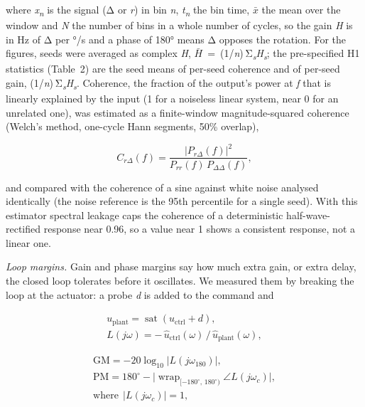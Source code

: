 \documentclass[11pt,letterpaper]{article}
\begin{document}
\noindent where \emph{x\textsubscript{n}} is the signal (Δ or \emph{r})
in bin \emph{n}, \emph{t\textsubscript{n}} the bin time, \emph{\ensuremath{\bar{x}}} the
mean over the window and \emph{N} the number of bins in a whole number
of cycles, so the gain \textbar{}\emph{H}\textbar{} is in Hz of Δ per
°/s and a phase of 180° means Δ opposes the rotation. For the figures,
seeds were averaged as complex \emph{H},
\emph{\ensuremath{\bar{H}}}~=~(1/\emph{n}) Σ\textsubscript{\emph{s}}\emph{H\textsubscript{s}};
the pre-specified H1 statistics (Table~2) are the seed means of per-seed
coherence and of per-seed gain,
(1/\emph{n}) Σ\textsubscript{\emph{s}}\textbar{}\emph{H\textsubscript{s}}\textbar.
Coherence, the fraction of the output's power at \emph{f} that is
linearly explained by the input (1 for a noiseless linear system, near 0
for an unrelated one), was estimated as a finite-window
magnitude-squared coherence (Welch's method, one-cycle Hann segments,
50\% overlap),

\[C_{r\Delta}(f)=\frac{|P_{r\Delta}(f)|^2}{P_{rr}(f)\,P_{\Delta\Delta}(f)},\tag{10}\]

\noindent and compared with the coherence of a sine against white noise
analysed identically (the noise reference is the 95th percentile for a
single seed). With this estimator spectral leakage caps the coherence of
a deterministic half-wave-rectified response near 0.96, so a value near
1 shows a consistent response, not a linear one.

\emph{Loop margins.} Gain and phase margins say how much extra gain, or
extra delay, the closed loop tolerates before it oscillates. We measured
them by breaking the loop at the actuator: a probe \emph{d} is added to
the command and

\[\begin{gathered}u_{\mathrm{plant}}=\operatorname{sat}(u_{\mathrm{ctrl}}+d),\\ L(j\omega)=-\,\hat u_{\mathrm{ctrl}}(\omega)\,/\,\hat u_{\mathrm{plant}}(\omega),\end{gathered}\tag{11}\]

\[\begin{gathered}\mathrm{GM}=-20\log_{10}\bigl|L(j\omega_{180})\bigr|,\\ \mathrm{PM}=180^\circ-\bigl|\operatorname{wrap}_{[-180^\circ,\,180^\circ)}\angle L(j\omega_c)\bigr|,\\ \text{where}\ \ |L(j\omega_c)|=1,\end{gathered}\tag{12}\]
\end{document}
